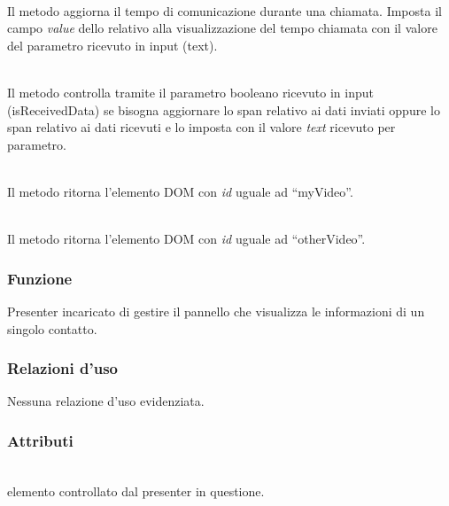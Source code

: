 \begin{description}
\item{}\\
Il metodo aggiorna il tempo di comunicazione durante una chiamata. Imposta il campo \textit{value} dello  relativo alla visualizzazione del tempo chiamata con il valore del parametro ricevuto in input (text).

\item{}\\
Il metodo controlla tramite il parametro booleano ricevuto in input (isReceivedData) se bisogna aggiornare lo span relativo ai dati inviati oppure lo span relativo ai dati ricevuti e lo imposta con il valore \textit{text} ricevuto per parametro.

\item{}\\
Il metodo ritorna l'elemento DOM con \textit{id} uguale ad ``myVideo''.

\item{}\\
Il metodo ritorna l'elemento DOM con \textit{id} uguale ad ``otherVideo''.

\end{description}


\subsubsection*{Funzione}
Presenter incaricato di gestire il pannello che visualizza le informazioni di un singolo contatto.

\subsubsection*{Relazioni d'uso}
Nessuna relazione d'uso evidenziata.

\subsubsection*{Attributi}
\begin{description}
\item{}\\
  elemento controllato dal presenter in questione.
\end{description}

